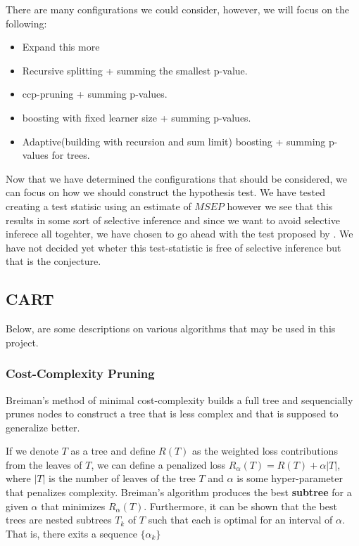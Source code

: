 \documentclass{article}
\theoremstyle{definition} \newtheorem{definition}[theorem]{Definition}
\theoremstyle{remark} \newtheorem{remark}[theorem]{Remark}
\begin{document}
There are many configurations we could consider, however, we will focus on the
following:
\begin{itemize}
  \item Expand this more
  \item Recursive splitting + summing the smallest p-value.
  \item ccp-pruning  + summing p-values.
  \item boosting with fixed learner size + summing p-values. 
  \item Adaptive(building with recursion and sum limit) boosting + summing p-values for trees. 
\end{itemize}

Now that we have determined the configurations that should be considered, we can
focus on how we should construct the hypothesis test. We have tested creating a
test statisic using an estimate of $ MSEP $ however we see that this results in
some sort of selective inference and since we want to avoid selective inferece
all togehter, we have chosen to go ahead with the test proposed by
\cite{hawkins1977testing}. We have not decided yet wheter this test-statistic is
free of selective inference but that is the conjecture. 

\subsection{CART}

Below, are some descriptions on various algorithms that may be used in this
project. 

\subsubsection{Cost-Complexity Pruning}

\label{sec:ccp}

Breiman's method of minimal cost-complexity builds a full tree and sequencially
prunes nodes to construct a tree that is less complex and that is supposed to
generalize better. 

If we denote $ T $ as a tree and define $ R(T) $ as the weighted loss
contributions from the leaves of $ T $, we can define a penalized loss $
R_{\alpha}(T) = R(T) + \alpha|T|$, where $ |T| $ is the number of leaves of the
tree $ T $ and $ \alpha $ is some hyper-parameter that penalizes complexity.
Breiman's algorithm produces the best \textbf{subtree} for a given $ \alpha $
that minimizes $ R_{\alpha}(T) $. Furthermore, it can be shown that the best
trees are nested subtrees $ T_k $ of $ T $ such that each is optimal for an
interval of $ \alpha $. That is, there exits a sequence $ \{\alpha_k \} $ 
\end{document}
